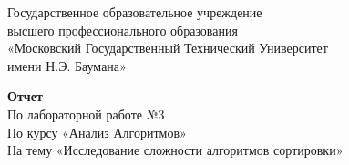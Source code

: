 \begin{titlepage}
	
	\thispagestyle{empty}
	
	\begin{figure}[t]
	\end{figure}

	\begin{center}
	Государственное образовательное учреждение\\
	высшего профессионального образования\\
 	«Московский Государственный Технический Университет\\
 	имени Н.Э. Баумана»
	\end{center}
	
	\vspace{5cm}
	
	\begin{center}
		\textbf {Отчет}\\
		По лабораторной работе №3 \\
		По курсу «Анализ Алгоритмов»\\
		На тему «Исследование сложности алгоритмов сортировки»\\
	\end{center}

	\vspace{10cm}
	

\end{titlepage}